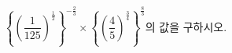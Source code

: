 $\left\{\left(\dfrac{1}{125}\right)^{\frac{1}{2}}\right\}^{-\frac{2}{3}}\times\left\{\left(\dfrac{4}{5}\right)^{\frac{3}{4}}\right\}^{\frac{8}{3}}$의 값을 구하시오.
